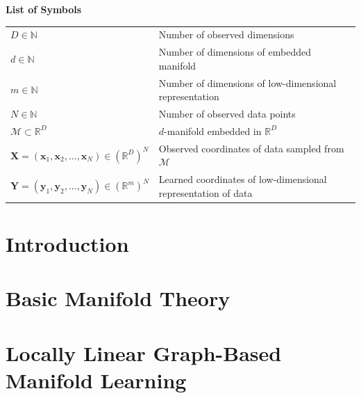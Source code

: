 \documentclass[12pt]{article}
\newcommand{\mani}{\mathcal{M}}
\newcommand{\N}{\mathbb{N}}
\newcommand{\R}{\mathbb{R}}
\newcommand{\RD}{\mathbb{R}^D}
\begin{document}
\tableofcontents
\newpage

\Large
\noindent
\textbf{List of Symbols}
\vspace{0.5cm} \\
\noindent
\normalsize

\begin{tabularx}{\textwidth}{ 
  >{\raggedleft\arraybackslash}X 
  >{\raggedright\arraybackslash}X}
  $D \in \N$ & Number of observed dimensions \\
  $d \in \N$ & Number of dimensions of embedded manifold \\
  $m \in \N$ & Number of dimensions of low-dimensional representation \\
  $N \in \N$ & Number of observed data points \\
  $\mani \subset \RD$ & $d$-manifold embedded in $\RD$ \\
  $\bm{X} = (\bm{x}_1, \bm{x}_2, ..., \bm{x}_N) \in (\RD)^N$ & Observed 
  coordinates of data sampled from $\mani$ \\
  $\bm{Y} = (\bm{y}_1, \bm{y}_2, ..., \bm{y}_N) \in (\R^m)^N$ & Learned 
  coordinates of low-dimensional representation of data
\end{tabularx}

\newpage

\listoffigures
\newpage
\listoftables
\newpage


    
\section{Introduction}
\label{intro}



\section{Basic Manifold Theory}
\label{math}


\section{Locally Linear Graph-Based Manifold Learning}
\label{lgb-mani-learn}

\end{document}
